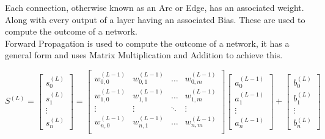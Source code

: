 \begin{flushleft}
                        Each connection, otherwise known as an Arc or Edge, has an associated weight. Along with every output of a
                        layer having an associated Bias. These are used to compute the outcome of a network. \\
                        \vspace{0.2cm}
                        Forward Propagation is used to compute the outcome of a network, it has a general form and uses 
                        Matrix Multiplication and Addition to achieve this.
                        \vspace{0.2cm}
                        
                        \begin{center}
                            $
                            S^{(L)} = 
                            \begin{bmatrix}
                            s^{(L)}_{0} \\
                            s^{(L)}_{1} \\
                            \vdots      \\
                            s^{(L)}_{n} 
                            \end{bmatrix}
                            = 
                            \begin{bmatrix}
                            w^{(L-1)}_{0,0} & w^{(L-1)}_{0,1} & \hdots  & w^{(L-1)}_{0,m} \\
                            w^{(L-1)}_{1,0} & w^{(L-1)}_{1,1} & \hdots  & w^{(L-1)}_{1,m} \\
                            \vdots          & \vdots          & \ddots  & \vdots          \\
                            w^{(L-1)}_{n,0} & w^{(L-1)}_{n,1} & \hdots  & w^{(L-1)}_{n,m} \\
                            \end{bmatrix}
                            \begin{bmatrix}
                            a^{(L-1)}_{0} \\
                            a^{(L-1)}_{1} \\
                            \vdots      \\
                            a^{(L-1)}_{n} 
                            \end{bmatrix}
                            +
                            \begin{bmatrix}
                            b^{(L)}_{0} \\
                            b^{(L)}_{1} \\
                            \vdots      \\
                            b^{(L)}_{n} 
                            \end{bmatrix}
                            $ 
                        \end{center}
                        

\end{flushleft}

